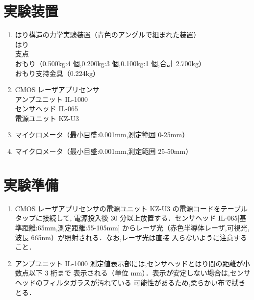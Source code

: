 \documentclass[a4paper,12pt]{jsarticle}
\begin{document}
\section{実験装置}
\begin{enumerate}
  \item はり構造の力学実験装置（青色のアングルで組まれた装置）\\
  はり\\
  支点\\
  おもり（0.500kg:4 個,0.200kg:3 個,0.100kg:1 個,合計 2.700kg）\\
  おもり支持金具（0.224kg）
  \item CMOS レーザアプリセンサ\\
  アンプユニット IL-1000\\
  センサヘッド IL-065\\
  電源ユニット KZ-U3
  \item マイクロメータ（最小目盛:0.001mm,測定範囲 0-25mm）
  \item マイクロメータ（最小目盛:0.001mm,測定範囲 25-50mm）
\end{enumerate}

\section{実験準備}
\begin{enumerate}
  \item CMOS レーザアプリセンサの電源ユニット KZ-U3 の電源コードをテーブルタップに接続して,
  電源投入後 30 分以上放置する．センサヘッド IL-065[基準距離:65mm,測定距離:55-105mm]
  からレーザ光（赤色半導体レーザ,可視光,波長 665nm）が照射される．なお,レーザ光は直接
  入らないように注意すること．
  \item アンプユニット IL-1000 測定値表示部には,センサヘッドとはり間の距離が小数点以下 3 桁まで
  表示される（単位 mm）．表示が安定しない場合は,センサヘッドのフィルタガラスが汚れている
  可能性があるため,柔らかい布で拭きとる．
\end{enumerate}
\end{document}
